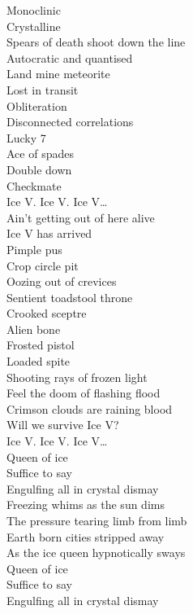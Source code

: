 Monoclinic\\
Crystalline\\
Spears of death shoot down the line\\
Autocratic and quantised\\
Land mine meteorite\\
Lost in transit\\
Obliteration\\
Disconnected correlations\\
Lucky 7\\
Ace of spades\\
Double down\\
Checkmate\\

Ice V. Ice V. Ice V…\\

Ain't getting out of here alive\\
Ice V has arrived\\

Pimple pus\\
Crop circle pit\\
Oozing out of crevices\\
Sentient toadstool throne\\
Crooked sceptre\\
Alien bone\\
Frosted pistol\\
Loaded spite\\
Shooting rays of frozen light\\
Feel the doom of flashing flood\\
Crimson clouds are raining blood\\

Will we survive Ice V?\\

Ice V. Ice V. Ice V…\\

Queen of ice\\
Suffice to say\\
Engulfing all in crystal dismay\\
Freezing whims as the sun dims\\
The pressure tearing limb from limb\\
Earth born cities stripped away\\
As the ice queen hypnotically sways\\
Queen of ice\\
Suffice to say\\
Engulfing all in crystal dismay\\

